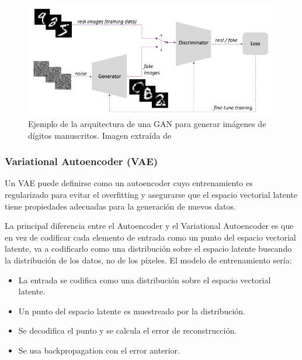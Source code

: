             \begin{figure}[!h]
                \centering
                \includegraphics[width=0.98\textwidth]{img/GAN.png}
                \caption{Ejemplo de la arquitectura de una GAN para generar imágenes de dígitos manuscritos. Imagen extraída de \cite{AAE}}
                \label{fig:GAN}
            \end{figure}
 
        \subsubsection{Variational Autoencoder (VAE)}
            \noindent Un VAE puede definirse como un autoencoder cuyo entrenamiento es regularizado para evitar el overfitting y asegurarse que el espacio vectorial latente tiene propiedades adecuadas para la generación de nuevos datos.

            \medskip

            \noindent La principal diferencia entre el Autoencoder y el Variational Autoencoder es que en vez de codificar cada elemento de entrada como un punto del espacio vectorial latente, va a codificarlo como una distribución sobre el espacio latente buscando la distribución de los datos, no de los píxeles. El modelo de entrenamiento sería:
            
            \begin{itemize}
                \item La entrada se codifica como una distribución sobre el espacio vectorial latente.
                \item Un punto del espacio latente es muestreado por la distribución. 
                \item Se decodifica el punto y se calcula el error de reconstrucción.
                \item Se usa backpropagation con el error anterior.
            \end{itemize}

